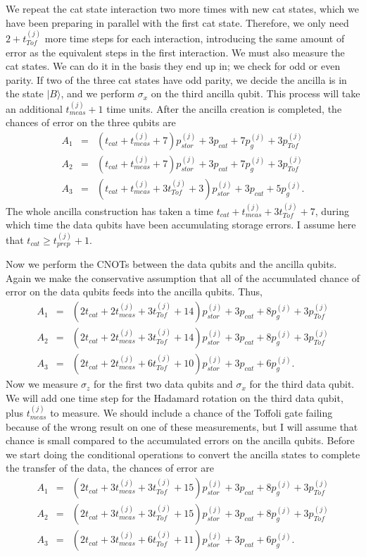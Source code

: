 \documentclass{report}
\newcommand{\ket}[1]{|{#1}\rangle}
\newcommand{\X}{\sigma_x}
\newcommand{\Z}{\sigma_z}
\newcommand{\ptj}[1]{p_{Tof}^{({#1})}}
\newcommand{\pgj}[1]{p_g^{({#1})}}
\newcommand{\psj}[1]{p_{stor}^{({#1})}}
\newcommand{\ttj}[1]{t_{Tof}^{({#1})}}
\newcommand{\tpj}[1]{t_{prep}^{({#1})}}
\newcommand{\tmj}[1]{t_{meas}^{({#1})}}
\begin{document}
We repeat the cat state interaction two more times with new cat states, 
which we have been preparing in parallel with the first cat state.  
Therefore, we only need $2+\ttj{j}$ more time steps for each interaction, 
introducing the same amount of error as the equivalent steps in the first 
interaction.  We must also measure the cat states.  We can do it in the basis 
they end up in; we check for odd or even parity.  If two of the three cat 
states have odd parity, we decide the ancilla is in the state $\ket{B}$, and 
we perform $\X$ on the third ancilla qubit.  This process will take an 
additional $\tmj{j} + 1$ time units.  After the ancilla creation is completed, 
the chances of error on the three qubits are
\begin{eqnarray}
A_1 & = & \left(t_{cat} + \tmj{j} + 7 \right) \psj{j} + 3p_{cat} + 7 \pgj{j} + 
3 \ptj{j} \\
A_2 & = & \left(t_{cat} + \tmj{j} + 7 \right) \psj{j} + 3p_{cat} + 7 \pgj{j} + 
3 \ptj{j} \\
A_3 & = & \left(t_{cat} + \tmj{j} + 3 \ttj{j} + 3 \right) \psj{j} + 3p_{cat} + 
5 \pgj{j}.
\end{eqnarray}
The whole ancilla construction has taken a time $t_{cat} + \tmj{j} + 3 \ttj{j} 
+ 7$, during which time the data qubits have been accumulating storage 
errors.  I assume here that $t_{cat} \geq \tpj{j} + 1$.

Now we perform the CNOTs between the data qubits and the ancilla qubits.  
Again we make the conservative assumption that all of the accumulated chance of 
error on the data qubits feeds into the ancilla qubits.  Thus,
\begin{eqnarray}
A_1 & \! = & \! \left(2 t_{cat} + 2 \tmj{j} + 3 \ttj{j} + 14 \right) \psj{j} + 
3 p_{cat} + 8 \pgj{j} + 3 \ptj{j} \\
A_2 &\!  = & \! \left(2 t_{cat} + 2 \tmj{j} + 3 \ttj{j} + 14 \right) \psj{j} + 
3 p_{cat} + 8 \pgj{j} + 3 \ptj{j} \\
A_3 & \! = & \! \left(2 t_{cat} + 2 \tmj{j} + 6 \ttj{j} + 10 \right) \psj{j} + 
3 p_{cat} + 6 \pgj{j}.
\end{eqnarray}
Now we measure $\Z$ for the first two data qubits and $\X$ for the third 
data qubit.  We will add one time step for the Hadamard rotation on the third 
data qubit, plus $\tmj{j}$ to measure.  We should include a chance of the 
Toffoli gate failing because of the wrong result on one of these 
measurements, but I will assume that chance is small compared to the 
accumulated errors on the ancilla qubits.  Before we start doing the 
conditional operations to convert the ancilla states to complete the transfer 
of the data, the chances of error are
\begin{eqnarray}
A_1 & \! = & \! \left(2 t_{cat} + 3 \tmj{j} + 3 \ttj{j} + 15 \right) \psj{j} + 
3 p_{cat} + 8 \pgj{j} + 3 \ptj{j} \\
A_2 & \! = & \! \left(2 t_{cat} + 3 \tmj{j} + 3 \ttj{j} + 15 \right) \psj{j} + 
3 p_{cat} + 8 \pgj{j} + 3 \ptj{j} \\
A_3 & \! = & \! \left(2 t_{cat} + 3 \tmj{j} + 6 \ttj{j} + 11 \right) \psj{j} + 
3 p_{cat} + 6 \pgj{j}.
\end{eqnarray}
\end{document}
